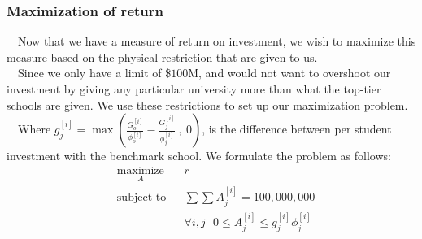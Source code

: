 \documentclass[12pt]{scrartcl}
\begin{document}
	\subsubsection{Maximization of return}
		\ \ Now that we have a measure of return on investment, we wish to maximize this measure based on the physical restriction that are given to us.\\
		
		\ \ Since we only have a limit of \$$100$M, and would not want to overshoot our investment by giving any particular university more than what the top-tier schools are given. We use these restrictions to set up our maximization problem.\\
		
		\ \ Where $g_j^{[i]} = \max( \frac{  G_o^{[i]}  }{  \phi_o^{[i]} } - \frac{  G_j^{[i]}  }{  \phi_j^{[i]} } \ ,\ 0 )$, is the difference between per student investment with the benchmark school. We formulate the problem as follows:
		\begin{equation}
				\begin{aligned}
					& \underset{A}{\text{maximize}}
					& &\bar{r}\\
					& \text{subject to}
					& & \sum \sum A_j^{[i]} = 100,000,000 \\
					&&& \forall i,j \ \ \ 0\le A_j^{[i]} \le g_j^{[i]}\phi_j^{[i]}
				\end{aligned}
		\end{equation}
\end{document}
